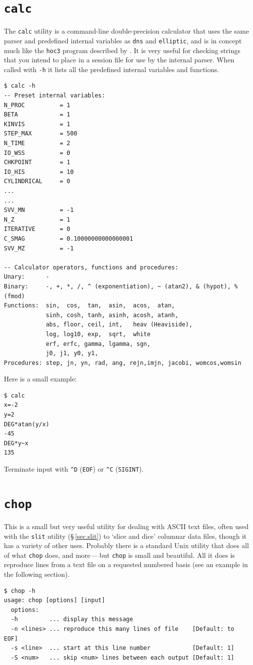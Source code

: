 \documentclass[11pt]{report}
\begin{document}
\section{\texttt{calc}}
\label{sec.calc}

The \verb|calc| utility is a command-line double-precision calculator
that uses the same parser and predefined internal variables as
\verb|dns| and \verb|elliptic|, and is in concept much like the
\verb|hoc3| program described by \citet{kernighan84}.  It is very useful for
checking strings that you intend to place in a session file for use by
the internal parser.  When called with \verb|-h| it lists all the
predefined internal variables and functions.

{\small
\begin{verbatim}
$ calc -h
-- Preset internal variables:
N_PROC          = 1
BETA            = 1
KINVIS          = 1
STEP_MAX        = 500
N_TIME          = 2
IO_WSS          = 0
CHKPOINT        = 1
IO_HIS          = 10
CYLINDRICAL     = 0
...
...
SVV_MN          = -1
N_Z             = 1
ITERATIVE       = 0
C_SMAG          = 0.10000000000000001
SVV_MZ          = -1

-- Calculator operators, functions and procedures:
Unary:      -
Binary:     -, +, *, /, ^ (exponentiation), ~ (atan2), & (hypot), % (fmod)
Functions:  sin,  cos,  tan,  asin,  acos,  atan,
            sinh, cosh, tanh, asinh, acosh, atanh,
            abs, floor, ceil, int,   heav (Heaviside),
            log, log10, exp,  sqrt,  white
            erf, erfc, gamma, lgamma, sgn,
            j0, j1, y0, y1,
Procedures: step, jn, yn, rad, ang, rejn,imjn, jacobi, womcos,womsin
\end{verbatim}
}
%
Here is a small example:
{\small
\begin{verbatim}
$ calc
x=-2
y=2
DEG*atan(y/x)
-45
DEG*y~x
135
\end{verbatim}
}
\noindent
Terminate input with \verb|^D| (\verb|EOF|) or \verb|^C| (\verb|SIGINT|).

\section{\texttt{chop}}
\label{sec.chop}

This is a small but very useful utility for dealing with ASCII text
files, often used with the \verb|slit| utility (\S\,\ref{sec.slit}) to
`slice and dice' columnar data files, though it has a variety of other
uses.  Probably there is a standard Unix utility that does all of what
\verb|chop| does, and more\,---\,but \verb|chop| is small and
beautiful. All it does is reproduce lines from a text file on a
requested numbered basis (see an example in the following section).
{\small
\begin{verbatim}
$ chop -h
usage: chop [options] [input]
  options:
  -h         ... display this message
  -n <lines> ... reproduce this many lines of file    [Default: to EOF]
  -s <line>  ... start at this line number            [Default: 1]
  -S <num>   ... skip <num> lines between each output [Default: 1]
\end{verbatim}
}
\end{document}

